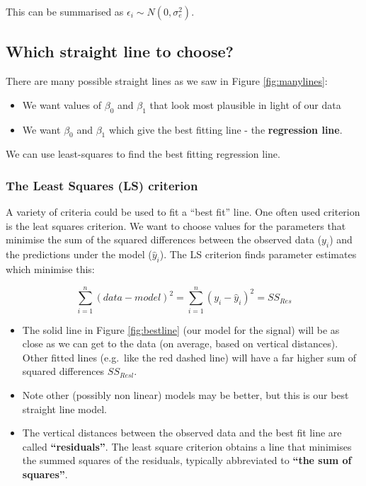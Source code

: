 \documentclass[
  oneside]{krantz}
\begin{document}
This can be summarised as \(\epsilon_i \sim N(0, \sigma_e^2)\).

\hypertarget{which-straight-line-to-choose}{%
\subsection{Which straight line to choose?}\label{which-straight-line-to-choose}}

There are many possible straight lines as we saw in Figure \ref{fig:manylines}:

\begin{itemize}
\item
  We want values of \(\beta_0\) and \(\beta_1\) that look most plausible in light of our data
\item
  We want \(\beta_0\) and \(\beta_1\) which give the best fitting line - the \textbf{regression line}.
\end{itemize}

We can use least-squares to find the best fitting regression line.

\hypertarget{the-least-squares-ls-criterion}{%
\subsubsection{The Least Squares (LS) criterion}\label{the-least-squares-ls-criterion}}

A variety of criteria could be used to fit a ``best fit'' line. One often used criterion is the leat squares criterion. We want to choose values for the parameters that minimise the sum of the squared differences between the observed data (\(y_i\)) and the predictions under the model (\(\hat{y}_i\)). The LS criterion finds parameter estimates which minimise this:

\[\sum_{i=1}^n (data-model)^2=\sum_{i=1}^n (y_i-\hat{y}_i)^2 = SS_{Res} \]

\begin{itemize}
\item
  The solid line in Figure \ref{fig:bestline} (our model for the signal) will be as close as we can get to the data (on average, based on vertical distances). Other fitted lines (e.g.~like the red dashed line) will have a far higher sum of squared differences \(SS_{Resl}\).
\item
  Note other (possibly non linear) models may be better, but this is our best straight line model.
\item
  The vertical distances between the observed data and the best fit line are called \textbf{``residuals''}. The least square criterion obtains a line that minimises the summed squares of the residuals, typically abbreviated to \textbf{``the sum of squares''}.
\end{itemize}
\end{document}
